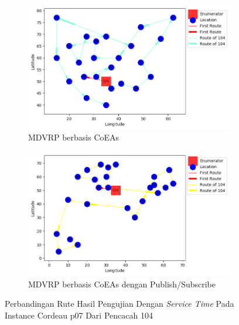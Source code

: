 \begin{figure}[H]
	\centering
	\begin{subfigure}[t]{\textwidth}
		\centering
		\includegraphics[width=\textwidth]{Resources/Images/cordeau_p07_tw/cordeau_p07_tw_104_coes}
		\caption{MDVRP berbasis CoEAs}
		\label{fig:cordeau_p07_tw_104_coes}
	\end{subfigure}
	\begin{subfigure}[t]{\textwidth}
		\centering
		\includegraphics[width=\textwidth]{Resources/Images/cordeau_p07_tw/cordeau_p07_tw_104_pubsub_coes}
		\caption{MDVRP berbasis CoEAs dengan Publish/Subscribe}
		\label{fig:cordeau_p07_tw_104_pubsub_coes}
	\end{subfigure}
	\caption{Perbandingan Rute Hasil Pengujian Dengan \textit{Service Time} Pada Instance Cordeau p07 Dari Pencacah 104}
	\label{fig:cordeau_p07_tw_104}
\end{figure}


